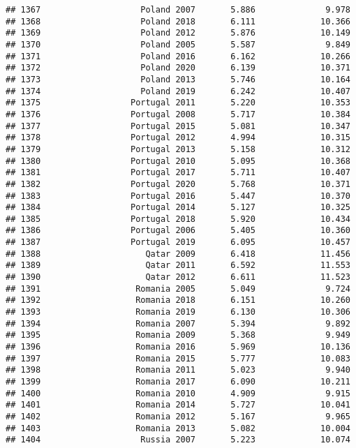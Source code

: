 \documentclass[
]{article}
\begin{document}
\begin{verbatim}
## 1367                    Poland 2007       5.886              9.978
## 1368                    Poland 2018       6.111             10.366
## 1369                    Poland 2012       5.876             10.149
## 1370                    Poland 2005       5.587              9.849
## 1371                    Poland 2016       6.162             10.266
## 1372                    Poland 2020       6.139             10.371
## 1373                    Poland 2013       5.746             10.164
## 1374                    Poland 2019       6.242             10.407
## 1375                  Portugal 2011       5.220             10.353
## 1376                  Portugal 2008       5.717             10.384
## 1377                  Portugal 2015       5.081             10.347
## 1378                  Portugal 2012       4.994             10.315
## 1379                  Portugal 2013       5.158             10.312
## 1380                  Portugal 2010       5.095             10.368
## 1381                  Portugal 2017       5.711             10.407
## 1382                  Portugal 2020       5.768             10.371
## 1383                  Portugal 2016       5.447             10.370
## 1384                  Portugal 2014       5.127             10.325
## 1385                  Portugal 2018       5.920             10.434
## 1386                  Portugal 2006       5.405             10.360
## 1387                  Portugal 2019       6.095             10.457
## 1388                     Qatar 2009       6.418             11.456
## 1389                     Qatar 2011       6.592             11.553
## 1390                     Qatar 2012       6.611             11.523
## 1391                   Romania 2005       5.049              9.724
## 1392                   Romania 2018       6.151             10.260
## 1393                   Romania 2019       6.130             10.306
## 1394                   Romania 2007       5.394              9.892
## 1395                   Romania 2009       5.368              9.949
## 1396                   Romania 2016       5.969             10.136
## 1397                   Romania 2015       5.777             10.083
## 1398                   Romania 2011       5.023              9.940
## 1399                   Romania 2017       6.090             10.211
## 1400                   Romania 2010       4.909              9.915
## 1401                   Romania 2014       5.727             10.041
## 1402                   Romania 2012       5.167              9.965
## 1403                   Romania 2013       5.082             10.004
## 1404                    Russia 2007       5.223             10.074

\end{verbatim}
\end{document}
